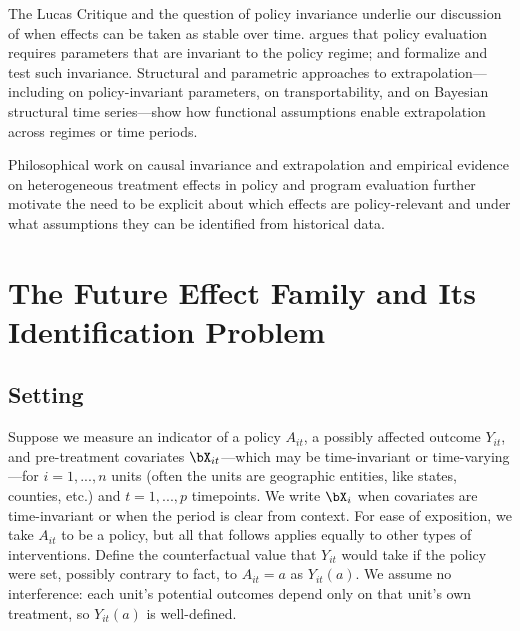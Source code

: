 \documentclass{article}
\begin{document}
The Lucas Critique and the question of policy invariance underlie our discussion of when effects can be taken as stable over time. \citet{lucasjrEconometricPolicyEvaluation1976} argues that policy evaluation requires parameters that are invariant to the policy regime; \citet{ericssonExogeneityCointegrationEconomic1998} and \citet{estrellaAreDeepParameters1999} formalize and test such invariance. Structural and parametric approaches to extrapolation---including \citet{heckmanStructuralEquationsTreatment2005} on policy-invariant parameters, \citet{pearlExternalValidityCalculus2022} on transportability, and \citet{brodersenInferringCausalImpact2015} on Bayesian structural time series---show how functional assumptions enable extrapolation across regimes or time periods.

Philosophical work on causal invariance and extrapolation \citep{cartwrightHuntingCausesUsing2007} and empirical evidence on heterogeneous treatment effects in policy and program evaluation \citep{gablerDealingHeterogeneityTreatment2009,cintronHeterogeneousTreatmentEffects2022} further motivate the need to be explicit about which effects are policy-relevant and under what assumptions they can be identified from historical data.

\section{The Future Effect Family and Its Identification Problem}\label{sec:future-effect-family}

\subsection{Setting}\label{context}

Suppose we measure an indicator of a policy $A_{it}$, a possibly affected outcome $Y_{it}$, and pre-treatment covariates $\bX_{it}$---which may be time-invariant or time-varying---for $i = 1, ..., n$ units (often the units are geographic entities, like states, counties, etc.) and $t = 1, ..., p$ timepoints. We write $\bX_i$ when covariates are time-invariant or when the period is clear from context. For ease of exposition, we take $A_{it}$ to be a policy, but all that follows applies equally to other types of interventions. Define the counterfactual value that $Y_{it}$ would take if the policy were set, possibly contrary to fact, to $A_{it} = a$ as $Y_{it}(a)$. We assume no interference: each unit's potential outcomes depend only on that unit's own treatment, so $Y_{it}(a)$ is well-defined.
\end{document}
